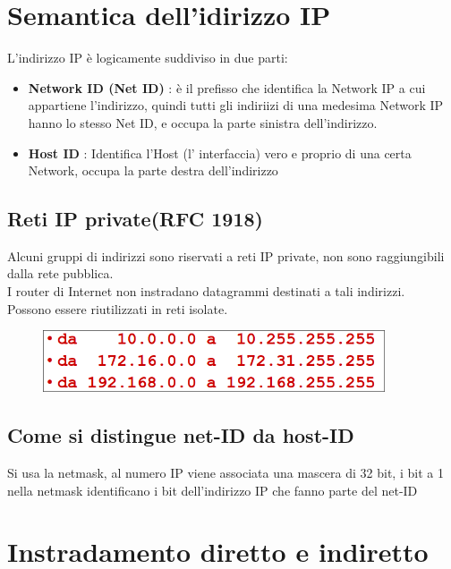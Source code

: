 \documentclass{report}
\begin{document}
            \section{Semantica dell'idirizzo IP}
                L'indirizzo IP è logicamente suddiviso in due parti:
                \begin{itemize}
                    \item \textbf{Network ID (Net ID)} : è il prefisso che identifica la Network IP a cui appartiene l'indirizzo, quindi tutti gli indiriizi di una medesima Network IP hanno lo stesso Net ID, e occupa la parte sinistra dell'indirizzo.
                    \item \textbf{Host ID} : Identifica l'Host (l' interfaccia) vero e proprio di una certa Network, occupa la parte destra dell'indirizzo
                \end{itemize}
                \subsection{Reti IP private(RFC 1918)}
                    Alcuni gruppi di indirizzi sono riservati a reti IP private, non sono raggiungibili dalla rete pubblica.
                    \\
                    I router di Internet non instradano datagrammi destinati a tali indirizzi.
                    \\
                    Possono essere riutilizzati in reti isolate.
                    \\
                     \begin{figure}[H]
                    \includegraphics[width=0.9\textwidth]{1/retiP.png}
                \end{figure}
                \subsection{Come si distingue net-ID da host-ID}
                    Si usa la netmask, al numero IP viene associata una mascera di 32 bit, i bit a 1 nella netmask identificano i bit dell'indirizzo IP che fanno parte del net-ID
            \section{Instradamento diretto e indiretto}
\end{document}
